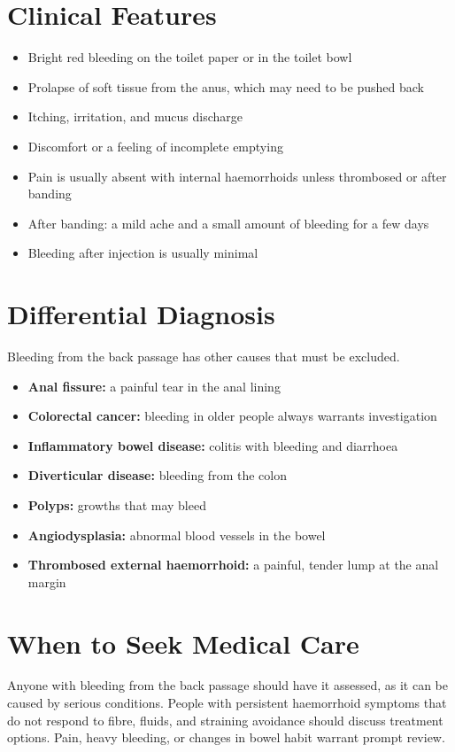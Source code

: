 \section*{Clinical Features}
\begin{itemize}
    \item Bright red bleeding on the toilet paper or in the toilet bowl
    \item Prolapse of soft tissue from the anus, which may need to be pushed back
    \item Itching, irritation, and mucus discharge
    \item Discomfort or a feeling of incomplete emptying
    \item Pain is usually absent with internal haemorrhoids unless thrombosed or after banding
    \item After banding: a mild ache and a small amount of bleeding for a few days
    \item Bleeding after injection is usually minimal
\end{itemize}

\section*{Differential Diagnosis}
Bleeding from the back passage has other causes that must be excluded.
\begin{itemize}
    \item \textbf{Anal fissure:} a painful tear in the anal lining
    \item \textbf{Colorectal cancer:} bleeding in older people always warrants investigation
    \item \textbf{Inflammatory bowel disease:} colitis with bleeding and diarrhoea
    \item \textbf{Diverticular disease:} bleeding from the colon
    \item \textbf{Polyps:} growths that may bleed
    \item \textbf{Angiodysplasia:} abnormal blood vessels in the bowel
    \item \textbf{Thrombosed external haemorrhoid:} a painful, tender lump at the anal margin
\end{itemize}

\section*{When to Seek Medical Care}
Anyone with bleeding from the back passage should have it assessed, as it can be caused by serious conditions. People with persistent haemorrhoid symptoms that do not respond to fibre, fluids, and straining avoidance should discuss treatment options. Pain, heavy bleeding, or changes in bowel habit warrant prompt review.

